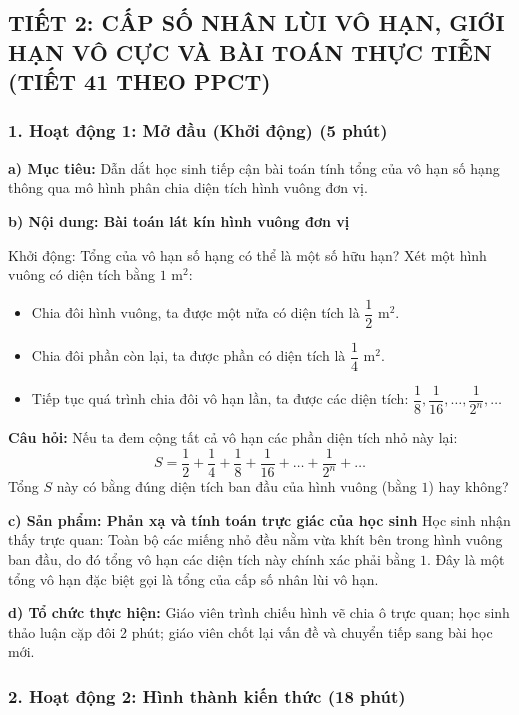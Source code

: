 \documentclass[12pt, a4paper]{article}
\begin{document}
\newpage

\subsection*{TIẾT 2: CẤP SỐ NHÂN LÙI VÔ HẠN, GIỚI HẠN VÔ CỰC VÀ BÀI TOÁN THỰC TIỄN (TIẾT 41 THEO PPCT)}

\subsubsection*{1. Hoạt động 1: Mở đầu (Khởi động) (5 phút)}

\noindent \textbf{a) Mục tiêu:}
Dẫn dắt học sinh tiếp cận bài toán tính tổng của vô hạn số hạng thông qua mô hình phân chia diện tích hình vuông đơn vị.

\noindent \textbf{b) Nội dung: Bài toán lát kín hình vuông đơn vị}
\begin{pedabox}{Khởi động: Tổng của vô hạn số hạng có thể là một số hữu hạn?}
Xét một hình vuông có diện tích bằng $1\text{ m}^2$:
\begin{itemize}[leftmargin=0.6cm]
    \item Chia đôi hình vuông, ta được một nửa có diện tích là $\dfrac{1}{2}\text{ m}^2$.
    \item Chia đôi phần còn lại, ta được phần có diện tích là $\dfrac{1}{4}\text{ m}^2$.
    \item Tiếp tục quá trình chia đôi vô hạn lần, ta được các diện tích: $\dfrac{1}{8}, \dfrac{1}{16}, \dots, \dfrac{1}{2^n}, \dots$
\end{itemize}
\textbf{Câu hỏi:} Nếu ta đem cộng tất cả vô hạn các phần diện tích nhỏ này lại:
$$S = \dfrac{1}{2} + \dfrac{1}{4} + \dfrac{1}{8} + \dfrac{1}{16} + \dots + \dfrac{1}{2^n} + \dots$$
Tổng $S$ này có bằng đúng diện tích ban đầu của hình vuông (bằng $1$) hay không?
\end{pedabox}

\noindent \textbf{c) Sản phẩm: Phản xạ và tính toán trực giác của học sinh}
Học sinh nhận thấy trực quan: Toàn bộ các miếng nhỏ đều nằm vừa khít bên trong hình vuông ban đầu, do đó tổng vô hạn các diện tích này chính xác phải bằng $1$. Đây là một tổng vô hạn đặc biệt gọi là tổng của cấp số nhân lùi vô hạn.

\noindent \textbf{d) Tổ chức thực hiện:}
Giáo viên trình chiếu hình vẽ chia ô trực quan; học sinh thảo luận cặp đôi 2 phút; giáo viên chốt lại vấn đề và chuyển tiếp sang bài học mới.

\subsubsection*{2. Hoạt động 2: Hình thành kiến thức (18 phút)}
\end{document}
